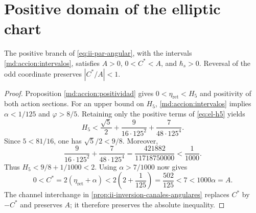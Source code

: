 \section{Positive domain of the elliptic chart}
\begin{proposition}
\label{iv:ellipse:pertenencia}
The positive branch of \eqref{eq:ii-par-angular}, with the
intervals \eqref{md:accion:intervalos}, satisfies
\(A>0\), \(0<C^*<A\), and \(\hbar_s>0\).
Reversal of the odd coordinate preserves \(|C^*/A|<1\).
\end{proposition}
\begin{proof}
Proposition \ref{md:accion:positividad} gives
\(0<\eta_{\mathrm{ret}}<H_5\) and positivity of both
action sections. For an upper bound on \(H_5\),
\eqref{md:accion:intervalos} implies
\(\alpha<1/125\) and \(\varphi>8/5\). Retaining only
the positive terms of \eqref{eq:el-h5} yields
\[
 H_5<
 \frac{\sqrt5}{2}+
 \frac{9}{16\cdot125^2}+
 \frac{7}{48\cdot125^4}.
\]
Since \(5<81/16\), one has \(\sqrt5/2<9/8\). Moreover,
\[
 \frac{9}{16\cdot125^2}+
 \frac{7}{48\cdot125^4}
 =\frac{421882}{11718750000}<\frac1{1000}.
\]
Thus \(H_5<9/8+1/1000<2\). Using
\(\alpha>7/1000\) now gives
\[
 0<C^*=2(\eta_{\mathrm{ret}}+\alpha)
 <2\left(2+\frac1{125}\right)=\frac{502}{125}
 <7<1000\alpha=A.
\]
The channel interchange in
\ref{prop:ii-inversion-canales-angulares} replaces \(C^*\) by \(-C^*\)
and preserves \(A\); it therefore preserves the absolute inequality.
\end{proof}
